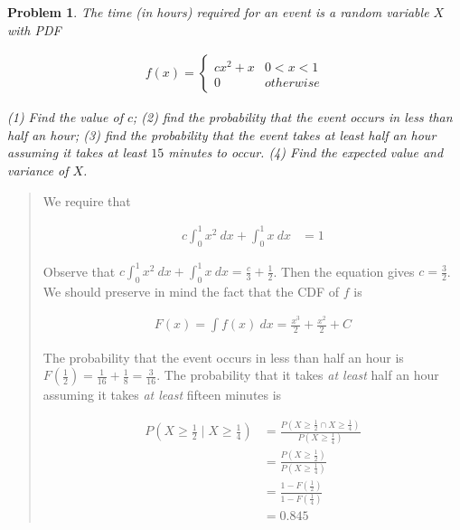 \documentclass[a4paper, 12pt]{article}
\newtheorem{problem}{Problem}
\newtheorem{problem}{Problem}
\begin{document}
\pagebreak 

\begin{problem}
    The time (in hours) required for an event is a random variable $X$ with PDF 

    \begin{align*}
        f(x) = \begin{cases}
            c x^2 + x & 0 < x < 1 \\ 
            0 & otherwise
        \end{cases}
    \end{align*}

    \textit{(1)} Find the value of $c$; \textit{(2)} find the probability that
    the event occurs in less than half an hour; \textit{(3)} find the
    probability that the event takes at least half an hour assuming it takes at
    least $15$ minutes to occur. \textit{(4)} Find the expected value and
    variance of $X$.
\end{problem}


\small
\begin{quote}

We require that 

\begin{align*}
    c \int_{0}^{1} x^2 ~ dx + \int_{0}^{1} x~ dx &= 1
\end{align*}

Observe that $c\int_0^1 x^2 ~ dx + \int_{0}^1 x ~ dx = \frac{c}{3} +
\frac{1}{2}$. Then the equation gives $c =\frac{3}{2}$. We should preserve in
mind the fact that the CDF of $f$ is

\begin{align*}
    F(x) = \int f(x) ~ dx = \frac{x^3}{2} + \frac{x^2}{2} + C
\end{align*}

The probability that the event occurs in less than half an hour is
$F(\frac{1}{2}) = \frac{1}{16} + \frac{1}{8} = \frac{3}{16}$. The probability
that it takes \textit{at least} half an hour assuming it takes \textit{at least}
fifteen minutes is 

\begin{align*}
    P( X \geq \frac{1}{2} \mid X \geq \frac{1}{4}) &= 
    \frac{ P(X \geq \frac{1}{2} \cap X \geq \frac{1}{4}) }{P(X \geq
    \frac{1}{4})} \\ 
                                                   &= \frac{P(X \geq
                                                   \frac{1}{2})}{P(X \geq
                                               \frac{1}{4})} \\ 
                                                   &= \frac{ 1 - F(\frac{1}{2})
                                                   }{1 - F(\frac{1}{4})} \\ 
                                                   &=0.845
\end{align*}

\end{quote}
\normalsize
\end{document}
